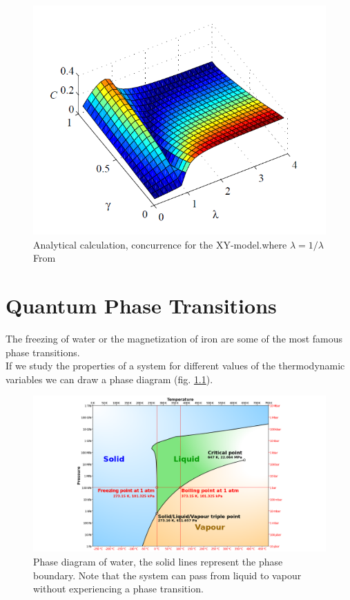 \documentclass[12pt,a4paper]{book}
\theoremstyle{definition}
\begin{document}
\begin{figure}[h]
	\centering
	\includegraphics[width=0.7\linewidth]{graphs/nielsenconc}
	\caption{Analytical calculation, concurrence for the XY-model.where $\lambda=1/\lambda$ From \cite{PhysRevA.66.032110}}
	\label{fig:nielsenconc}
\end{figure}



\chapter{Quantum Phase Transitions}
The freezing of water or the magnetization of iron are some of the most famous phase transitions.\\
If we study the properties of a system for different values of the  thermodynamic variables we can draw a phase diagram \cite{Huang_1987} (fig. \ref{fig:phasediagramofwater}).

\begin{figure}[h]
	\centering
	\includegraphics[width=0.7\linewidth]{graphs/Phase_diagram_of_water}
	\caption{Phase diagram of water, the solid lines represent the phase boundary. Note that the system can pass from liquid to vapour without experiencing a phase transition.}
	\label{fig:phasediagramofwater}
\end{figure}
\end{document}
